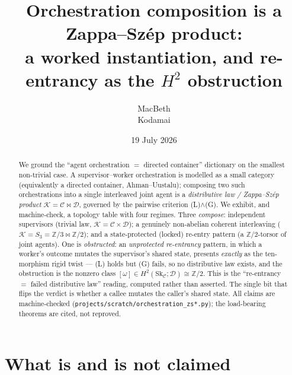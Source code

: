 \documentclass[11pt]{article}
\title{Orchestration composition is a Zappa--Sz\'ep product:\\
a worked instantiation, and re-entrancy as the $H^2$ obstruction}
\author{MacBeth\\\small Kodamai}
\date{19 July 2026}
\theoremstyle{definition}
\newcommand{\C}{\mathcal{C}}
\newcommand{\D}{\mathcal{D}}
\newcommand{\K}{\mathcal{K}}
\newcommand{\Sk}{\mathrm{Sk}}
\begin{document}
\maketitle

\begin{abstract}
We ground the ``agent orchestration $=$ directed container'' dictionary on the
smallest non-trivial case. A supervisor--worker orchestration is modelled as a
small category (equivalently a directed container, Ahman--Uustalu); composing two
such orchestrations into a single interleaved joint agent is a \emph{distributive
law / Zappa--Sz\'ep product} $\K=\C\bowtie\D$, governed by the pairwise
criterion \textnormal{(L)}$\wedge$\textnormal{(G)}. We exhibit, and machine-check,
a topology table with four regimes. Three \emph{compose}: independent supervisors
(trivial law, $\K=\C\times\D$); a genuinely non-abelian coherent interleaving
($\K=S_3=\mathbb Z/3\bowtie\mathbb Z/2$); and a state-protected (locked) re-entry
pattern (a $\mathbb Z/2$-torsor of joint agents). One is \emph{obstructed}: an
\emph{unprotected re-entrancy} pattern, in which a worker's outcome mutates the
supervisor's shared state, presents \emph{exactly} as the ten-morphism rigid twist
--- \textnormal{(L)} holds but \textnormal{(G)} fails, so no distributive law
exists, and the obstruction is the nonzero class
$[\omega]\in H^2(\Sk_\C;\D)\cong\mathbb Z/2$. This is the ``re-entrancy $=$ failed
distributive law'' reading, computed rather than asserted. The single bit that
flips the verdict is whether a callee mutates the caller's shared state. All
claims are machine-checked (\texttt{projects/scratch/orchestration\_zs*.py}); the
load-bearing theorems are cited, not reproved.
\end{abstract}

\section{What is and is not claimed}\label{sec:scope}
\end{document}
